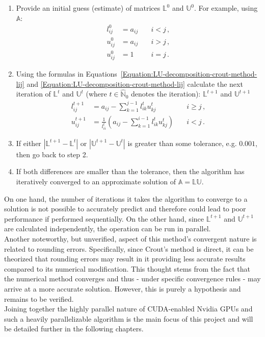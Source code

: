 \begin{enumerate}
	\item Provide an initial guess (estimate) of matrices $ \mathbb{L}^0 $ and $ \mathbb{U}^0 $. For example, using $ \mathbb{A} $:
		\begin{align}
			l_{ij}^{0} &= a_{ij} \quad &i < j \nonumber\,, \\
			u_{ij}^{0} &= a_{ij} \quad &i > j \nonumber\,, \\
			u_{ij}^{0} &= 1 \quad      &i = j \nonumber\,.
		\end{align}
	\item Using the formulas in Equations~\ref{Equation:LU-decomposition-crout-method-lij} and \ref{Equation:LU-decomposition-crout-method-lij} calculate the next iteration of $ \mathbb{L}^{t} $ and $ \mathbb{U}^{t} $ (where $ t \in \widehat{\mathbb{N}}_0 $ denotes the iteration): $ \mathbb{L}^{t+1} $ and $ \mathbb{U}^{t+1} $
		\begin{align}
			l_{ij}^{t+1} &= a_{ij} - \sum_{k=1}^{j-1}l_{ik}^{t}u_{kj}^{t} 								   		&\quad i \geq j \nonumber\,, \\
			u_{ij}^{t+1} &= \frac{1}{l_{ii}^{t}} \left ( a_{ij} - \sum_{k=1}^{i-1}l_{ik}^{t}u_{kj}^{t} \right ) &\quad i < j    \nonumber\,. 
		\end{align}
	\item If either $ \left | \mathbb{L}^{t+1} - \mathbb{L}^{t} \right | $ or $ \left | \mathbb{U}^{t+1} - \mathbb{U}^{t} \right | $ is greater than some tolerance, e.g. $ 0.001 $, then go back to step 2.
	\item If both differences are smaller than the tolerance, then the algorithm has iteratively converged to an approximate solution of $ \mathbb{A} = \mathbb{LU} $.
\end{enumerate}

On one hand, the number of iterations it takes the algorithm to converge to a solution is not possible to accurately predict and therefore could lead to poor performance if performed sequentially. On the other hand, since $ \mathbb{L}^{t+1} $ and $ \mathbb{U}^{t+1} $ are calculated independently, the operation can be run in parallel. \\
Another noteworthy, but unverified, aspect of this method's convergent nature is related to rounding errors. Specifically, since Crout's method is direct, it can be theorized that rounding errors may result in it providing less accurate results compared to its numerical modification. This thought stems from the fact that the numerical method converges and thus - under specific convergence rules - may arrive at a more accurate solution. However, this is purely a hypothesis and remains to be verified. \\
Joining together the highly parallel nature of CUDA-enabled Nvidia GPUs and such a heavily parallelizable algorithm is the main focus of this project and will be detailed further in the following chapters.
